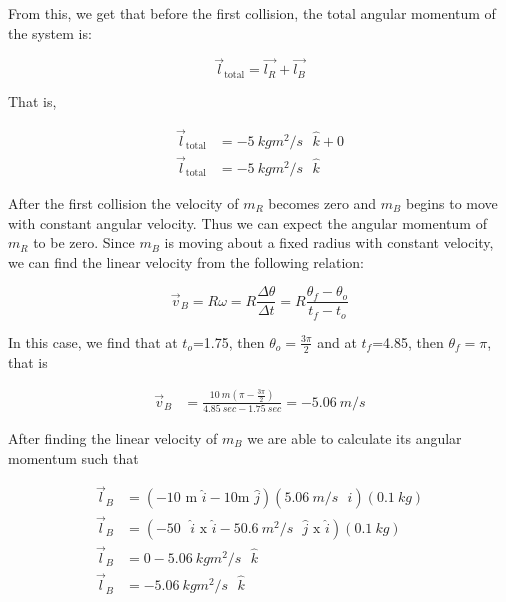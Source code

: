 \documentclass[12pt]{article}
\begin{document}
From this, we get that before the first collision, the total angular momentum of the system is:

\begin{equation} \label{eq2}
    \vec{l}_\text{total} = \vec{l_R} + \vec{l_B}
\end{equation}

That is,

\begin{equation*}
    \begin{split}
        \vec{l}_\text{total} & = \SI{-5}{kg m^2/s} \text{ $\hat{k}$} + 0 \\
        \vec{l}_\text{total} & = \SI{-5}{kg m^2/s} \text{ $\hat{k}$}
    \end{split}
\end{equation*}

After the first collision the velocity of $m_R$ becomes zero and $m_B$ begins to move with constant angular velocity. Thus we can expect the angular momentum of $m_R$ to be zero. Since $m_B$ is moving about a fixed radius with constant velocity, we can find the linear velocity from the following relation:

\begin{equation} \label{eq3}
    \vec{v}_B = R \omega = R \frac{\Delta \theta}{\Delta t} = R \frac{\theta_f - \theta_o}{t_f - t_o}
\end{equation}

In this case, we find that at $t_o$=1.75, then $\theta_o = \frac{3\pi}{2}$ and at $t_f$=4.85, then $\theta_f = \pi$, that is

\begin{equation*}
    \begin{split}
        \vec{v}_B & = \frac{\SI{10}{m}(\pi - \frac{3\pi}{2})}{\SI{4.85}{sec} - \SI{1.75}{sec}} = \SI{-5.06}{m/s}
    \end{split}
\end{equation*}

After finding the linear velocity of $m_B$ we are able to calculate its angular momentum such that

\begin{equation*}
    \begin{split}
        \vec{l}_B & = (-10 \text{ m $\hat{i}$} - 10 \text{m $\hat{j}$})(\SI{5.06}{m/s} \text{ $\hat{i}$}) (\SI{0.1}{kg}) \\
        \vec{l}_B & = (-50 \text{ $\hat{i}$ x $\hat{i}$} - \SI{50.6}{m^2/s} \text{ $\hat{j}$ x $\hat{i}$}) (\SI{0.1}{kg}) \\
        \vec{l}_B & = 0 - \SI{5.06}{kg m^2/s} \text{ $\hat{k}$} \\
        \vec{l}_B & = \SI{-5.06}{kg m^2/s} \text{ $\hat{k}$}
    \end{split}
\end{equation*}
\end{document}
